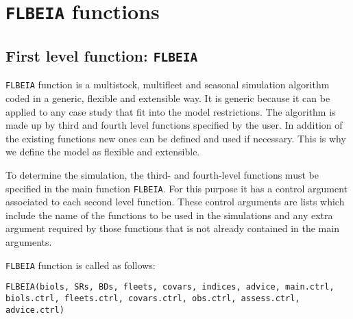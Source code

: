 
\section{\texttt{FLBEIA} functions} \label{sec:FLBEIAfun}

\subsection{First level function: \texttt{FLBEIA}} \label{sec:1stlvl}

	\texttt{FLBEIA} function is a multistock, multifleet and seasonal simulation algorithm coded in a generic, flexible and extensible way. It is generic because it can be applied to any case study that fit into the model restrictions. The algorithm is made up by third and fourth level functions specified by the user. In addition of the existing functions new ones can be defined and used if necessary. This is why we define the model as flexible and extensible. 
	
	To determine the simulation, the third- and fourth-level functions must be specified in the main function \texttt{FLBEIA}. For this purpose it has a control argument associated to each second level function. These control arguments are lists which include the name of the functions to be used in the simulations and any extra argument required by those functions that is not already contained in the main arguments. 
	
\noindent \texttt{FLBEIA} function is called as follows:

\begin{center}
  \texttt{FLBEIA(biols, SRs, BDs, fleets, covars, indices, advice, 
        main.ctrl, biols.ctrl, fleets.ctrl, covars.ctrl, obs.ctrl, assess.ctrl, advice.ctrl) }
\end{center}

